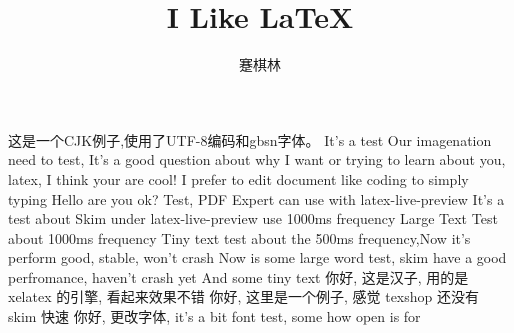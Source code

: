 \documentclass[UTF8]{ctexart}
\title{I Like \LaTeX}
\author{蹇棋林}
\begin{document}
\maketitle
这是一个CJK例子,使用了UTF-8编码和gbsn字体。
It's a test
Our imagenation need to test,
\Large It's a good question about why I want or trying to learn about you, latex, I think your are cool! I prefer to edit document like coding to simply typing
\tiny Hello are you ok?
\Large Test, PDF Expert can use with latex-live-preview
\tiny It's a test about Skim under latex-live-preview use 1000ms frequency
\Large Large Text Test about 1000ms frequency
\tiny Tiny text test about the 500ms frequency,Now it's perform good, stable, won't crash
\Large Now is some large word test, skim have a good perfromance, haven't crash yet
\tiny And some tiny text
\Large 你好, 这是汉子, 用的是 xelatex 的引擎, 看起来效果不错
\Large 你好, 这里是一个例子, 感觉 texshop 还没有 skim 快速
\tiny 你好, 更改字体, 
\Large it's a bit font test, some how open is for
\end{document}
